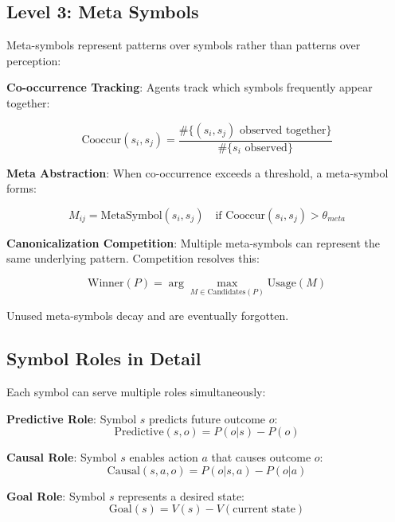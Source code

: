 \documentclass[11pt,a4paper]{article}
\begin{document}
\subsection{Level 3: Meta Symbols}

Meta-symbols represent patterns over symbols rather than patterns over perception:

\textbf{Co-occurrence Tracking}: Agents track which symbols frequently appear together:

\begin{equation}
\text{Cooccur}(s_i, s_j) = \frac{\#\{(s_i, s_j) \text{ observed together}\}}{\#\{s_i \text{ observed}\}}
\end{equation}

\textbf{Meta Abstraction}: When co-occurrence exceeds a threshold, a meta-symbol forms:

\begin{equation}
M_{ij} = \text{MetaSymbol}(s_i, s_j) \quad \text{if } \text{Cooccur}(s_i, s_j) > \theta_{meta}
\end{equation}

\textbf{Canonicalization Competition}: Multiple meta-symbols can represent the same underlying pattern. Competition resolves this:

\begin{equation}
\text{Winner}(P) = \arg\max_{M \in \text{Candidates}(P)} \text{Usage}(M)
\end{equation}

Unused meta-symbols decay and are eventually forgotten.

\subsection{Symbol Roles in Detail}

Each symbol can serve multiple roles simultaneously:

\textbf{Predictive Role}: Symbol $s$ predicts future outcome $o$:
\begin{equation}
\text{Predictive}(s, o) = P(o | s) - P(o)
\end{equation}

\textbf{Causal Role}: Symbol $s$ enables action $a$ that causes outcome $o$:
\begin{equation}
\text{Causal}(s, a, o) = P(o | s, a) - P(o | a)
\end{equation}

\textbf{Goal Role}: Symbol $s$ represents a desired state:
\begin{equation}
\text{Goal}(s) = V(s) - V(\text{current state})
\end{equation}
\end{document}
